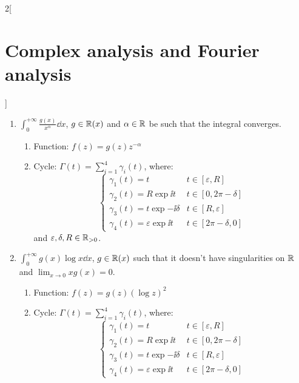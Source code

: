 \documentclass[../../../main.tex]{subfiles}
\begin{document}
\begin{multicols}{2}[\section{Complex analysis and Fourier analysis}]
\begin{method}
\begin{enumerate}
\begin{enumerate}
$$\begin{cases}
                        \gamma_2(t)=R\exp{\ii t} & t\in[0,\pi] \\
                      \end{cases}
                    $$
                    and $R\in\RR_{>0}$.
            \end{enumerate}
      \item $\displaystyle\int_0^{+\infty} \frac{g(x)}{x^\alpha}\dd{x}$, $g\in\mathbb{R}(x)$ and $\alpha\in\mathbb{R}$ be such that the integral converges.
            \begin{enumerate}
              \item Function: $f(z)=g(z)z^{-\alpha}$
              \item Cycle: $\Gamma(t)=\sum_{i=1}^4\gamma_i(t)$, where:
                    $$
                      \begin{cases}
                        \gamma_1(t)=t                      & t\in[\varepsilon,R] \\
                        \gamma_2(t)=R\exp{\ii t}           & t\in[0,2\pi-\delta] \\
                        \gamma_3(t)=t\exp{-\ii \delta}     & t\in[R,\varepsilon] \\
                        \gamma_4(t)=\varepsilon\exp{\ii t} & t\in[2\pi-\delta,0]
                      \end{cases}
                    $$
                    and $\varepsilon,\delta,R\in\mathbb{R}_{>0}$.
            \end{enumerate}
      \item $\displaystyle\int_0^{+\infty} g(x)\log{x}\dd{x}$, $g\in\mathbb{R}(x)$ such that it doesn't have singularities on $\mathbb{R}$ and $\displaystyle\lim_{x\to 0}xg(x)=0$.
            \begin{enumerate}
              \item Function: $f(z)=g(z){(\log{z})}^2$
              \item Cycle: $\Gamma(t)=\sum_{i=1}^4\gamma_i(t)$, where:
                    $$
                      \begin{cases}
                        \gamma_1(t)=t                      & t\in[\varepsilon,R] \\
                        \gamma_2(t)=R\exp{\ii t}           & t\in[0,2\pi-\delta] \\
                        \gamma_3(t)=t\exp{-\ii \delta}     & t\in[R,\varepsilon] \\
                        \gamma_4(t)=\varepsilon\exp{\ii t} & t\in[2\pi-\delta,0]
                      \end{cases}
$$
\end{enumerate}
\end{enumerate}
\end{method}
\end{multicols}
\end{document}
